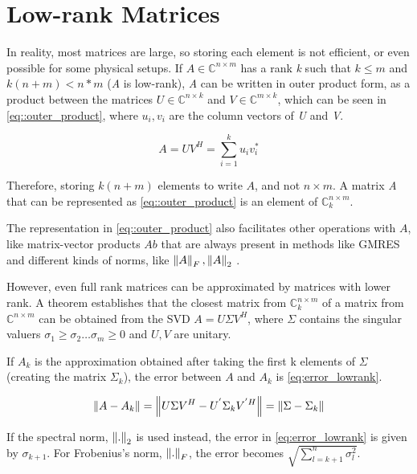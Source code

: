 
\section{Low-rank Matrices}

In reality, most matrices are large, so storing each element is not efficient, or even possible for some physical setups. If $A \in \mathbb{C}^{n\times m}$ has a rank \textit{k} such that $k \leq m$ and $k(n+m) < n*m$ (\textit{A} is low-rank), \textit{A} can be written in outer product form, as a product between the matrices $U \in \mathbb{C}^{n\times k} $ and $V \in \mathbb{C}^{m\times k}$, which can be seen in \ref{eq::outer_product}, where $u_{i}, v_{i}$ are the column vectors of \textit{U} and \textit{V}.

\begin{equation}\label{eq::outer_product}
    A = UV^{H} = \sum_{i=1} ^{k} u_{i} v_{i} ^{*}
\end{equation}


Therefore, storing $k(n+m)$ elements to write $A$, and not $n\times m$. A matrix \textit{A} that can be represented as \ref{eq::outer_product} is an element of $\mathbb{C}^{n\times m}_{k}$.

The representation in \ref{eq::outer_product} also facilitates other operations with $A$, like matrix-vector products $Ab$ that are always present in methods like GMRES \cite{bebendorf2008hierarchical} and different kinds of norms, like $\left\lVert A\right\rVert_{F}, \left\lVert A\right\rVert_{2}$ \cite{bebendorf2008hierarchical}.

However, even full rank matrices can be approximated by matrices with lower rank. A theorem \cite{bebendorf2008hierarchical} establishes that the closest matrix from $\mathbb{C}^{n\times m}_{k}$ of a matrix from $\mathbb{C}^{n\times m}$ can be obtained from the SVD $A = U \Sigma V^{H}$, where $\Sigma$ contains the singular valuers $\sigma_{1} \geq \sigma_{2} \dots \sigma_{m} \geq 0$ and $U,V$ are unitary.

If $ A_{k} $ is the approximation obtained after taking the first k elements of $\Sigma$ (creating the matrix $ \Sigma_{k} $), the error between $ A $ and $ A_{k} $ is \ref{eq:error_lowrank}.

\begin{equation}\label{eq:error_lowrank}
    \left\lVert A-A_{k}\right\rVert = \left\lVert U\Sigma V^{H} - U^{'} \Sigma_{k} V^{' H}\right\rVert = \left\lVert\Sigma - \Sigma_{k}\right\rVert
\end{equation}

If the spectral norm, $\left\lVert.\right\rVert_{2} $ is used instead, the error in \ref{eq:error_lowrank} is given by $\sigma_{k+1}$. For Frobenius's norm, $\left\lVert.\right\rVert_{F}$, the error becomes $\sqrt{\sum^{n}_{l=k+1} \sigma^{2}_{l}}$.

